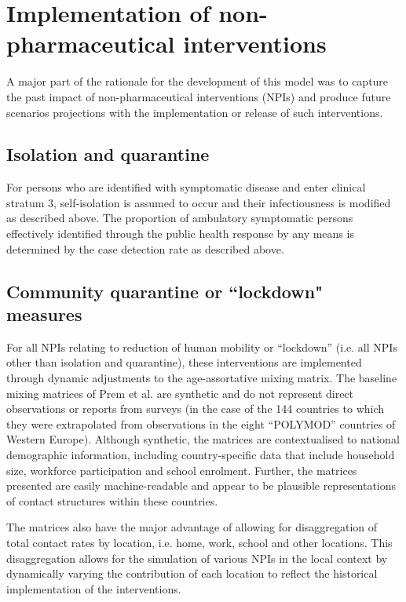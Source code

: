 \section{Implementation of non-pharmaceutical interventions} \label{npi}
A major part of the rationale for the development of this model was to capture the past impact of non-pharmaceutical interventions (NPIs) and produce future scenarios projections with the implementation or release of such interventions.

\subsection{Isolation and quarantine}
For persons who are identified with symptomatic disease and enter clinical stratum 3, self-isolation is assumed to occur and their infectiousness is modified as described above. The proportion of ambulatory symptomatic persons effectively identified through the public health response by any means is determined by the case detection rate as described above.

\subsection{Community quarantine or ``lockdown" measures}
For all NPIs relating to reduction of human mobility or “lockdown” (i.e. all NPIs other than isolation and quarantine), these interventions are implemented through dynamic adjustments to the age-assortative mixing matrix. The baseline mixing matrices of Prem et al. \cite{RN19} are synthetic and do not represent direct observations or reports from surveys (in the case of the 144 countries to which they were extrapolated from observations in the eight ``POLYMOD” countries of Western Europe). Although synthetic, the matrices are contextualised to national demographic information, including country-specific data that include household size, workforce participation and school enrolment. Further, the matrices presented are easily machine-readable and appear to be plausible representations of contact structures within these countries.

The matrices also have the major advantage of allowing for disaggregation of total contact rates by location, i.e. home, work, school and other locations. This disaggregation allows for the simulation of various NPIs in the local context by dynamically varying the contribution of each location to reflect the historical implementation of the interventions.

